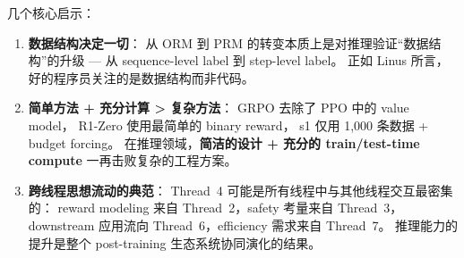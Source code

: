 \noindent
几个核心启示：
\begin{enumerate}[leftmargin=2em]
  \item \textbf{数据结构决定一切}：
    从 ORM 到 PRM 的转变本质上是对推理验证``数据结构''的升级 ---
    从 sequence-level label 到 step-level label。
    正如 Linus 所言，好的程序员关注的是数据结构而非代码。

  \item \textbf{简单方法 + 充分计算 > 复杂方法}：
    GRPO 去除了 PPO 中的 value model，
    R1-Zero 使用最简单的 binary reward，
    s1 仅用 1,000 条数据 + budget forcing。
    在推理领域，\textbf{简洁的设计 + 充分的 train/test-time compute}
    一再击败复杂的工程方案。

  \item \textbf{跨线程思想流动的典范}：
    Thread~4 可能是所有线程中与其他线程交互最密集的：
    reward modeling 来自 Thread~2，safety 考量来自 Thread~3，
    downstream 应用流向 Thread~6，efficiency 需求来自 Thread~7。
    推理能力的提升是整个 post-training 生态系统协同演化的结果。
\end{enumerate}
